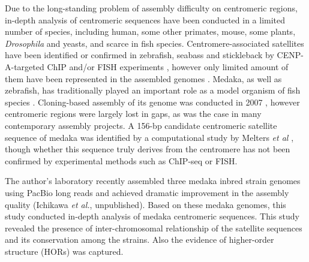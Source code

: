 Due to the long-standing problem of assembly difficulty on centromeric regions, in-depth analysis of centromeric sequences have been conducted in a limited number of species, including human, some other primates, mouse, some plants, \textit{Drosophila} and yeasts, and scarce in fish species. Centromere-associated satellites have been identified or confirmed in zebrafish, seabass and stickleback by CENP-A-targeted ChIP and/or FISH experiments \cite{Phillips2000, Kuznetsova2014, Cech2015}, however only limited amount of them have been represented in the assembled genomes \cite{Howe2013, Vij2016, Cech2015}. Medaka, as well as zebrafish, has traditionally played an important role as a model organism of fish species \cite{Wittbrodt2002}. Cloning-based assembly of its genome was conducted in 2007 \cite{Kasahara2007}, however centromeric regions were largely lost in gaps, as was the case in many contemporary assembly projects. A 156-bp candidate centromeric satellite sequence of medaka was identified by a computational study by Melters \textit{et al} \cite{Melters2013}, though whether this sequence truly derives from the centromere has not been confirmed by experimental methods such as ChIP-seq or FISH.

The author's laboratory recently assembled three medaka inbred strain genomes using PacBio long reads and achieved dramatic improvement in the assembly quality (Ichikawa \textit{et al.}, unpublished). Based on these medaka genomes, this study conducted in-depth analysis of medaka centromeric sequences. This study revealed the presence of inter-chromosomal relationship of the satellite sequences and its conservation among the strains. Also the evidence of higher-order structure (HORs) was captured.
